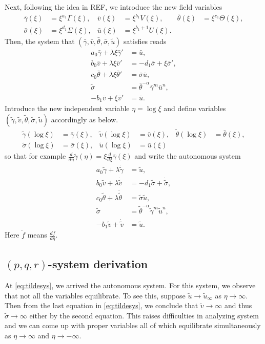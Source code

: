 \documentclass[a4paper,11pt]{article}
\def\bg{{\bar{\gamma}}}
\def\bv{{\bar{v}}}
\def\bth{{\bar{\theta}}}
\def\bs{{\bar{\sigma}}}
\def\bu{{\bar{u}}}
\def\tg{{\tilde{\gamma}}}
\def\tv{{\tilde{v}}}
\def\tth{{\tilde{\theta}}}
\def\ts{{\tilde{\sigma}}}
\def\tu{{\tilde{u}}}
\def\dtg{{\dot{\tilde{\gamma}}}}
\def\dtv{{\dot{\tilde{v}}}}
\def\dtth{{\dot{\tilde{\theta}}}}
\def\dts{{\dot{\tilde{\sigma}}}}
\begin{document}
Next, following the idea in REF, we introduce the new field variables
\begin{equation} \label{eq:CAPtoBAR}
\begin{aligned}
 \bg(\xi)&=\xi^{a_1}\Gamma(\xi), &
 \bv(\xi)&=\xi^{b_1}V(\xi), &
 \bth(\xi)&=\xi^{c_1}\Theta(\xi), \\
 \bs(\xi)&=\xi^{d_1}\Sigma(\xi), &
 \bu(\xi)&=\xi^{b_1+1}U(\xi).
\end{aligned}
\end{equation}
Then, the system that $(\bg,\bv,\bth,\bs,\tu)$ satisfies reads
\begin{equation} \label{eq:barsys}
 \begin{aligned}
  a_0\bg + \lambda\xi\bg' &=\bu,\\
  b_0\bv + \lambda\xi\bv' &=-d_1 \bs + \xi\bs',\\
  c_0\bth+ \lambda\xi\bth'&=\bs\bu,\\
  \ts &=\bth^{-\alpha}\bg^m\bu^n,\\
  -b_1\bv+\xi\bv' &= \bu.
 \end{aligned}
\end{equation}
Introduce the new independent variable $\eta = \log\xi$ and define variables $(\tg,\tv,\tth,\ts,\tu)$ accordingly as below.
\begin{equation} \label{eq:BARtoTIL}
\begin{aligned}
 \tg(\log\xi)&=\bg(\xi), &
 \tv(\log\xi)&=\bv(\xi), &
 \tth(\log\xi)&=\bth(\xi), \\
 \ts(\log\xi)&=\bs(\xi), &
 \tu(\log\xi)&=\bu(\xi)
\end{aligned}
\end{equation}
so that for example $\frac{d}{d\eta}\tg(\eta) = \xi \frac{d}{d\xi}\bg(\xi)$ and write the autonomous system
\begin{equation} \label{eq:tildesys}
 \begin{aligned}
  a_0\tg + \lambda\dtg &=\tu,\\
  b_0\tv + \lambda\dtv &=-d_1 \ts + \dts,\\
  c_0\tth+ \lambda\dtth&=\ts\tu,\\
  \ts &=\tth^{-\alpha}\tg^m\tu^n,\\
  -b_1\tv+\dtv &= \tu.
 \end{aligned}
\end{equation}
Here $\dot{f}$ means $\frac{df}{d\eta}$.



\subsection{$(p,q,r)$-system derivation}
At \eqref{eq:tildesys}, we arrived the autonomous system. For this system, we observe that not all the variables equilibrate. To see this, suppose $\tu \rightarrow \tu_\infty$ as $\eta \rightarrow \infty$. Then from the last equation in \eqref{eq:tildesys}, we conclude that $\tv \rightarrow \infty$ and thus $\ts \rightarrow \infty$ either by the second equation. This raises difficulties in analyzing system and we can come up with proper variables all of which equilibrate simultaneously as $\eta \rightarrow \infty$ and $\eta \rightarrow -\infty$.
\end{document}

